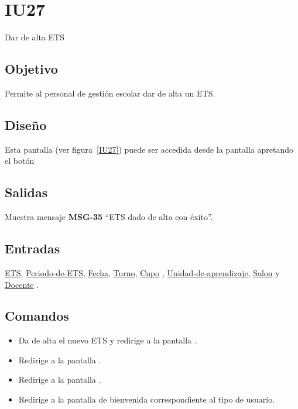
\section{IU27} {Dar de alta ETS}
\subsection{Objetivo}
    Permite al personal de gestión escolar dar de alta un ETS.
\subsection{Diseño}
    Esta pantalla  (ver figura~\ref{IU27}) puede ser accedida desde la pantalla  apretando el botón 

\subsection{Salidas}
Muestra mensaje {\bf MSG-35} ``ETS  dado de alta con éxito''.
\subsection{Entradas}
\hyperlink{ETS.ETS }{ETS},  \hyperlink{ETS.Periodo-de-ETS }{ Periodo-de-ETS},  \hyperlink{ETS.Fecha}{Fecha},  \hyperlink{ETS.Turno}{Turno},  \hyperlink{ETS.Cupo} {Cupo} ,  \hyperlink{ETS.Unidad-de-aprendizaje }{Unidad-de-aprendizaje},  \hyperlink{ETS.Salon}{Salon} y \hyperlink{ETS.Docente}{Docente} .
\subsection{Comandos}
\begin{itemize}
    \item {} Da de alta el nuevo ETS y redirige a la pantalla .
    \item {} Redirige a la pantalla .
    \item {} Redirige a la pantalla .
    \item {} Redirige a la pantalla de bienvenida correspondiente al tipo de usuario.
    
\end{itemize}

